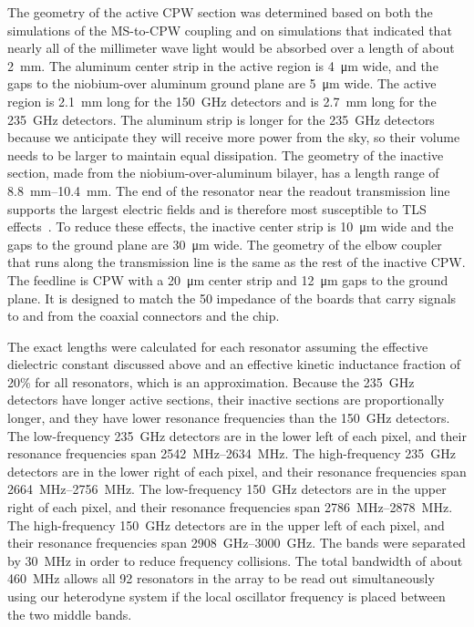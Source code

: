 The geometry of the active CPW section was determined based on both the simulations of the MS-to-CPW coupling and on simulations that indicated that nearly all of the millimeter wave light would be absorbed over a length of about \SI{2}{mm}.
The aluminum center strip in the active region is \SI{4}{\micro\meter} wide, and the gaps to the niobium-over aluminum ground plane are \SI{5}{\micro\meter} wide.
The active region is \SI{2.1}{mm} long for the \SI{150}{GHz} detectors and is \SI{2.7}{mm} long for the \SI{235}{GHz} detectors.
The aluminum strip is longer for the \SI{235}{GHz} detectors because we anticipate they will receive more power from the sky, so their volume needs to be larger to maintain equal dissipation.
The geometry of the inactive section, made from the niobium-over-aluminum bilayer, has a length range of \SIrange{8.8}{10.4}{mm}.
The end of the resonator near the readout transmission line supports the largest electric fields and is therefore most susceptible to TLS effects~\autocite{Gao2008aAPL, Gao2008bAPL,Zmuidzinas2012ARCMP}.
To reduce these effects, the inactive center strip is \SI{10}{\micro\meter} wide and the gaps to the ground plane are \SI{30}{\micro\meter} wide.
The geometry of the elbow coupler that runs along the transmission line is the same as the rest of the inactive CPW.
The feedline is CPW with a \SI{20}{\micro\meter} center strip and \SI{12}{\micro\meter} gaps to the ground plane.
It is designed to match the \SI{50}{\Omega} impedance of the boards that carry signals to and from the coaxial connectors and the chip.

The exact lengths were calculated for each resonator assuming the effective dielectric constant discussed above and an effective kinetic inductance fraction of 20\% for all resonators, which is an approximation.
Because the \SI{235}{GHz} detectors have longer active sections, their inactive sections are proportionally longer, and they have lower resonance frequencies than the \SI{150}{GHz} detectors.
The low-frequency \SI{235}{GHz} detectors are in the lower left of each pixel, and their resonance frequencies span \SIrange{2542}{2634}{MHz}.
The high-frequency \SI{235}{GHz} detectors are in the lower right of each pixel, and their resonance frequencies span \SIrange{2664}{2756}{MHz}.
The low-frequency \SI{150}{GHz} detectors are in the upper right of each pixel, and their resonance frequencies span \SIrange{2786}{2878}{MHz}.
The high-frequency \SI{150}{GHz} detectors are in the upper left of each pixel, and their resonance frequencies span \SIrange{2908}{3000}{GHz}.
The bands were separated by \SI{30}{MHz} in order to reduce frequency collisions.
The total bandwidth of about \SI{460}{MHz} allows all 92 resonators in the array to be read out simultaneously using our heterodyne system if the local oscillator frequency is placed between the two middle bands.


